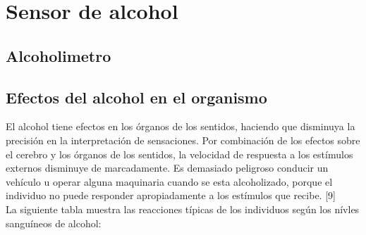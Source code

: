 \chapter{Sensor de alcohol}

\section{Alcoholimetro}

\section{Efectos del alcohol en el organismo}
El alcohol tiene efectos en los órganos de los sentidos, haciendo que disminuya la precisión en la interpretación de sensaciones. Por combinación de los efectos sobre el cerebro y los órganos de los sentidos, la velocidad de respuesta a los estímulos externos disminuye de marcadamente. Es demasiado peligroso conducir un vehículo u operar alguna maquinaria cuando se esta alcoholizado, porque el individuo no puede responder apropiadamente a los estímulos que recibe. [9] \\
La siguiente tabla muestra las reacciones típicas de los individuos según los nívles sanguíneos de alcohol:
